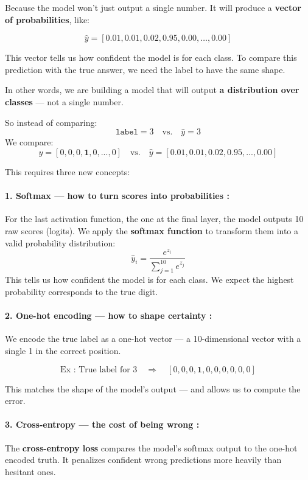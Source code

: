 \documentclass[11pt]{article}
\begin{document}
Because the model won’t just output a single number. It will produce a \textbf{vector of probabilities}, like:

\[
\hat{y} = [0.01, 0.01, 0.02, \mathbf{0.95}, 0.00, \dots, 0.00]
\]

This vector tells us how confident the model is for each class. To compare this prediction with the true answer, we need the label to have the same shape.

\medskip
In other words, we are building a model that will output \textbf{a distribution over classes} — not a single number.

So instead of comparing:
\[
\texttt{label} = 3 \quad \text{vs.} \quad \hat{y} = 3
\]
We compare:
\[
y = [0, 0, 0, \mathbf{1}, 0, ..., 0] \quad \text{vs.} \quad \hat{y} = [0.01, 0.01, 0.02, \mathbf{0.95}, ..., 0.00]
\]

This requires three new concepts:

\paragraph{1. Softmax — how to turn scores into probabilities :}

For the last activation function, the one at the final layer, the model outputs 10 raw scores (logits).  
We apply the \textbf{softmax function} to transform them into a valid probability distribution:
\[
\hat{y}_i = \frac{e^{z_i}}{\sum_{j=1}^{10} e^{z_j}}
\]
This tells us how confident the model is for each class. We expect the highest probability corresponds to the true digit.

\paragraph{2. One-hot encoding — how to shape certainty :}

We encode the true label as a one-hot vector — a 10-dimensional vector with a single 1 in the correct position.

\[
\text{Ex : True label for } 3 \quad \Rightarrow \quad [0, 0, 0, \mathbf{1}, 0, 0, 0, 0, 0, 0]
\]

This matches the shape of the model’s output — and allows us to compute the error.

\paragraph{3. Cross-entropy — the cost of being wrong :}

The \textbf{cross-entropy loss} compares the model’s softmax output to the one-hot encoded truth.  
It penalizes confident wrong predictions more heavily than hesitant ones.
\end{document}
